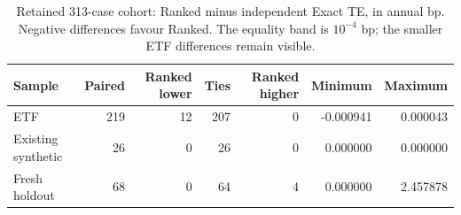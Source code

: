 \begin{table}[htbp]\centering\small\setlength{\tabcolsep}{4pt}
\caption{Retained 313-case cohort: Ranked minus independent Exact TE, in annual bp. Negative differences favour Ranked. The equality band is $10^{-4}$ bp; the smaller ETF differences remain visible.}\label{tab:historical}
\begin{tabular}{lrrrrrr}\toprule
Sample & Paired & Ranked lower & Ties & Ranked higher & Minimum & Maximum\\\midrule
ETF & 219 & 12 & 207 & 0 & -0.000941 & 0.000043\\
Existing synthetic & 26 & 0 & 26 & 0 & 0.000000 & 0.000000\\
Fresh holdout & 68 & 0 & 64 & 4 & 0.000000 & 2.457878\\
\bottomrule\end{tabular}\end{table}
